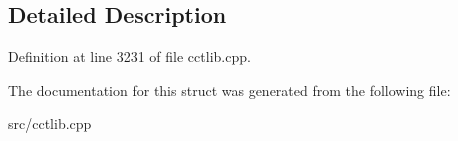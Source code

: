 \subsection{Detailed Description}


Definition at line 3231 of file cctlib.\-cpp.



The documentation for this struct was generated from the following file\-:\begin{DoxyCompactItemize}
\item 
src/cctlib.\-cpp\end{DoxyCompactItemize}
